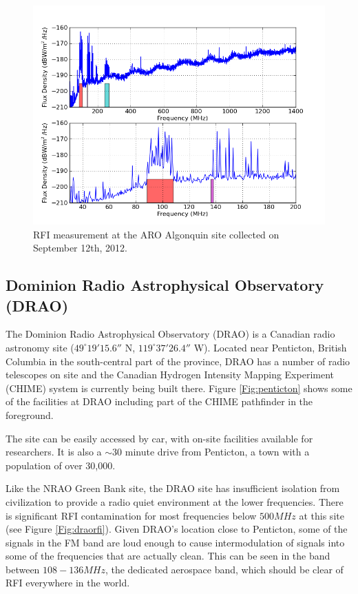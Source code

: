 \begin{figure}[tb]
\begin{center}
\includegraphics[width=0.9\linewidth]{RFI_testing/figures/ALG_bands.png}
\caption{RFI measurement at the ARO Algonquin site collected on September 12th, 2012.}
\label{Fig:arorfi}
\end{center}
\end{figure}


\subsection{Dominion Radio Astrophysical Observatory (DRAO)}

The Dominion Radio Astrophysical Observatory (DRAO) is a Canadian radio astronomy site ($49^\circ 19' 15.6''$ N, $119^\circ 37' 26.4''$ W). Located near Penticton, British Columbia in the south-central part of the province, DRAO has a number of radio telescopes on site and the Canadian Hydrogen Intensity Mapping Experiment (CHIME) system is currently being built there. Figure \ref{Fig:penticton} shows some of the facilities at DRAO including part of the CHIME pathfinder in the foreground. 

The site can be easily accessed by car, with on-site facilities available for researchers. It is also a $\sim$30 minute drive from Penticton, a town with a population of over 30,000. 

Like the NRAO Green Bank site, the DRAO site has insufficient isolation from civilization to provide a radio quiet environment at the lower frequencies. There is significant RFI contamination for most frequencies below $500 MHz$ at this site (see Figure \ref{Fig:draorfi}). Given DRAO's location close to Penticton, some of the signals in the FM band are loud enough to cause intermodulation of signals into some of the frequencies that are actually clean. This can be seen in the band between $108-136 MHz$, the dedicated aerospace band, which should be clear of RFI everywhere in the world. 


